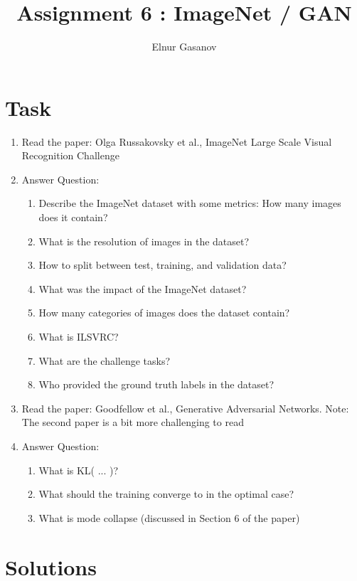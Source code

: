 \documentclass{article}
\author{Elnur Gasanov}
\title{Assignment 6 : ImageNet / GAN}
\date{}
\begin{document}
\maketitle

\section{Task}

\begin{enumerate}
	\item Read the paper: Olga Russakovsky et al., ImageNet Large Scale Visual Recognition Challenge
	\item Answer Question: \begin{enumerate} \item Describe the ImageNet dataset with some metrics: How many images does it contain? \item  What is the resolution of images in the dataset? \item How to split between test, training, and validation data? \item What was the impact of the ImageNet dataset? \item How many categories of images does the dataset contain? \item What is ILSVRC? \item What are the challenge tasks? \item Who provided the ground truth labels in the dataset? \end{enumerate} 
	\item Read the paper: Goodfellow et al., Generative Adversarial Networks. Note: The second paper is a bit more challenging to read
	\item Answer Question: \begin{enumerate} \item What is KL( ... )? \item What should the training converge to in the optimal case? \item What is mode collapse (discussed in Section 6 of the paper) \end{enumerate} 
\end{enumerate}

\section{Solutions}
\end{document}
